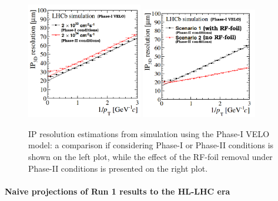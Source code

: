 \begin{figure}[h]
\centerline{
\includegraphics[width=0.45\textwidth]{figures/velo_ph21.png}
\includegraphics[width=0.45\textwidth]{figures/velo_ph22.png}
}
  \caption{IP resolution estimations from simulation using the Phase-I VELO model: a comparison if considering Phase-I or Phase-II conditions is shown on the left plot, while the effect of the RF-foil removal under Phase-II conditions is presented on the right plot.}
  \label{fig:veloip_hllhc}
\end{figure}

\paragraph{Naive projections of Run 1 results to the HL-LHC era}

